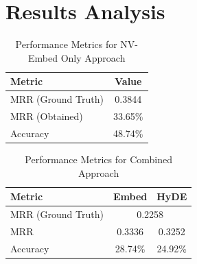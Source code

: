 \section{Results Analysis}

\begin{table}[ht]
    \centering
    
    \label{tab:nvembed_results}
    \begin{tabular}{|l|c|}
        \hline
        \textbf{Metric} & \textbf{Value} \\
        \hline
        MRR (Ground Truth) & 0.3844 \\
        MRR (Obtained) & 33.65\%\\
        Accuracy & 48.74\% \\
        \hline
    \end{tabular}
    \caption{Performance Metrics for NV-Embed Only Approach}
\end{table}

\begin{table}[ht]
    \centering
    
    \label{tab:combined_results}
    \begin{tabular}{|l|c|c|}
        \hline
        \textbf{Metric} & \textbf{Embed} & \textbf{HyDE} \\
        \hline
        MRR (Ground Truth) & \multicolumn{2}{c|}{0.2258} \\
        \hline
        MRR & 0.3336 & 0.3252 \\
        Accuracy & 28.74\% & 24.92\% \\
        \hline
    \end{tabular}
    \caption{Performance Metrics for Combined Approach}
\end{table}


